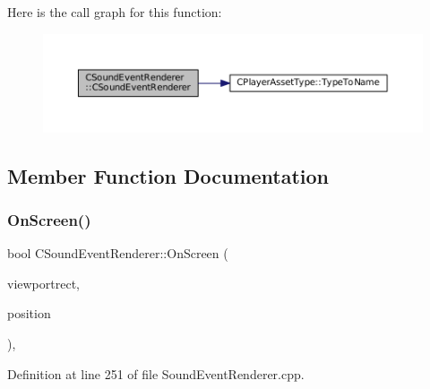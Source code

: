 Here is the call graph for this function\+:\nopagebreak
\begin{figure}[H]
\begin{center}
\leavevmode
\includegraphics[width=350pt]{classCSoundEventRenderer_a2a1c105a120bebf386b772a06c2a053a_cgraph}
\end{center}
\end{figure}


\subsection{Member Function Documentation}
\hypertarget{classCSoundEventRenderer_a9df97d476a3a39cb7126db9c366c2f0c}{}\label{classCSoundEventRenderer_a9df97d476a3a39cb7126db9c366c2f0c} 
\subsubsection{\texorpdfstring{On\+Screen()}{OnScreen()}}
{\footnotesize\ttfamily bool C\+Sound\+Event\+Renderer\+::\+On\+Screen (\begin{DoxyParamCaption}\item[{const \hyperlink{structSRectangle}{S\+Rectangle} \&}]{viewportrect,  }\item[{const \hyperlink{classCPosition}{C\+Position} \&}]{position }\end{DoxyParamCaption})\hspace{0.3cm}{\ttfamily [static]}, {\ttfamily [protected]}}



Definition at line 251 of file Sound\+Event\+Renderer.\+cpp.



